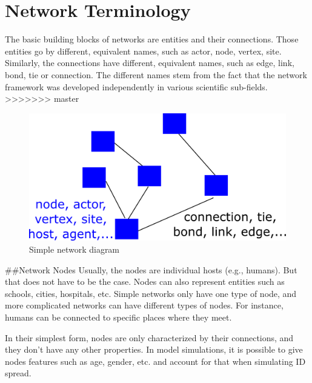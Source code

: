 \documentclass[]{book}
\theoremstyle{definition}
\theoremstyle{definition}
\theoremstyle{definition}
\theoremstyle{remark}
\begin{document}
\section{Network Terminology}\label{network-terminology}

The basic building blocks of networks are entities and their
connections. Those entities go by different, equivalent names, such as
actor, node, vertex, site. Similarly, the connections have different,
equivalent names, such as edge, link, bond, tie or connection. The
different names stem from the fact that the network framework was
developed independently in various scientific sub-fields.
>>>>>>> master

\begin{figure}
\centering
\includegraphics{./images/network-diagram.png}
\caption{Simple network diagram}
\end{figure}

\#\#Network Nodes Usually, the nodes are individual hosts (e.g.,
humans). But that does not have to be the case. Nodes can also represent
entities such as schools, cities, hospitals, etc. Simple networks only
have one type of node, and more complicated networks can have different
types of nodes. For instance, humans can be connected to specific places
where they meet.

In their simplest form, nodes are only characterized by their
connections, and they don't have any other properties. In model
simulations, it is possible to give nodes features such as age, gender,
etc. and account for that when simulating ID spread.
\end{document}
